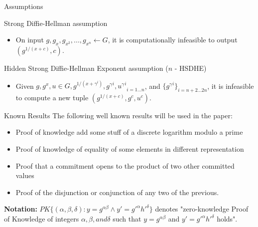 \documentclass{beamer}
\begin{document}
\begin{frame}{Assumptions}
    \begin{block}{Strong Diffie-Hellman assumption}
    \begin{itemize}
        \justifying
        \item  On input $g, g_x, g_{x^2} ,...,g_{x^n} \leftarrow G$, it is computationally infeasible to output $(g^{1/(x+c)}, c)$.
    \end{itemize}
    \end{block}
    \begin{block}{Hidden Strong Diffie-Hellman Exponent assumption ($n$ - HSDHE)}
    \begin{itemize}
        \justifying
        \item  Given $g, g^x, u \in G, {g^{1/(x+\gamma^i)}, {g^\gamma}^i, {u^\gamma}^i}_{i=1...n}$, and $\{{g^\gamma}^i \}_{i=n+2...2n}$, it is infeasible to compute a new tuple $(g^{1/(x+c)}, g^c, u^c)$.
    \end{itemize}
    \end{block}
\end{frame}

\begin{frame}{Known Results}
    The following well known results will be used in the paper: 
    \begin{itemize}
        \justifying
        \item Proof of knowledge add some stuff of a discrete logarithm modulo a prime
        \item Proof of knowledge of equality of some elements in different representation
        \item Proof that a commitment opens to the product of two other committed values
        \item Proof of the disjunction or conjunction of any two of the previous.
    \end{itemize}
    
    \textbf{Notation:} $PK\{(\alpha, \beta, \delta) : y = g^{\alpha\beta} \land y' = g'^\alpha h'^\delta\}$ denotes "zero-knowledge Proof of Knowledge of integers $\alpha, \beta, and \delta$ such that $y = g^{\alpha\beta}$ and $y' = g'^\alpha h'^\delta$ holds". 
\end{frame}
\end{document}
